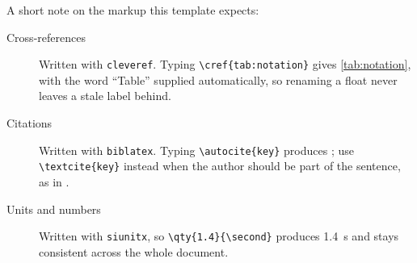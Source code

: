 A short note on the markup this template expects:

\begin{description}
  \item[Cross-references] Written with \texttt{cleveref}. Typing
        \verb|\cref{tab:notation}| gives \cref{tab:notation}, with the
        word \enquote{Table} supplied automatically, so renaming a
        float never leaves a stale label behind.
  \item[Citations] Written with \texttt{biblatex}. Typing
        \verb|\autocite{key}| produces \autocite{perez2007ipython}; use
        \verb|\textcite{key}| instead when the author should be part of
        the sentence, as in \textcite{hunter2007matplotlib}.
  \item[Units and numbers] Written with \texttt{siunitx}, so
        \verb|\qty{1.4}{\second}| produces \qty{1.4}{\second} and stays
        consistent across the whole document.
\end{description}
